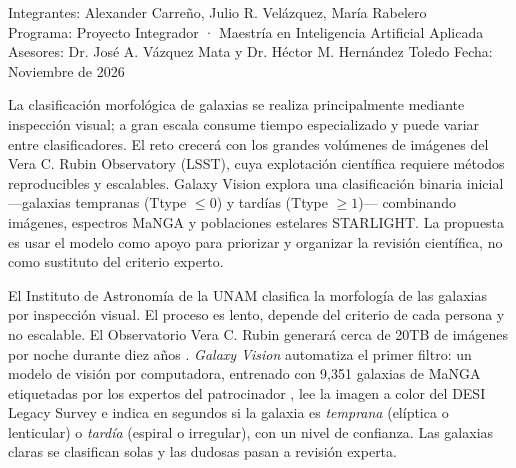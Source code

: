 \documentclass[letterpaper,11pt]{article}
\begin{document}
\thispagestyle{primera}

\smallskip
\noindent{\large\textcolor{black!60}{Resumen ejecutivo para el Instituto de Astronomía de la UNAM}\par}
\medskip

\noindent\begingroup\setlength{\fboxsep}{6pt}%
\colorbox{black!8}{\parbox{\dimexpr\linewidth-2\fboxsep\relax}{\small{}%
\textcolor{black!60}{Integrantes:} Alexander Carreño, Julio R. Velázquez, María Rabelero\\
\textcolor{black!60}{Programa:} Proyecto Integrador · Maestría en Inteligencia Artificial Aplicada\\
\textcolor{black!60}{Asesores:} Dr. José A. Vázquez Mata y Dr. Héctor M. Hernández Toledo \textcolor{black!60}{Fecha:} Noviembre de 2026}}%
\endgroup\par\medskip

La clasificación morfológica de galaxias se realiza principalmente mediante inspección visual; a gran escala consume tiempo especializado y puede variar entre clasificadores. El reto crecerá con los grandes volúmenes de imágenes del Vera C. Rubin Observatory (LSST), cuya explotación científica requiere métodos reproducibles y escalables. Galaxy Vision explora una clasificación binaria inicial —galaxias tempranas (Ttype $\leq 0$) y tardías (Ttype $\geq 1$)— combinando imágenes, espectros MaNGA y poblaciones estelares STARLIGHT. La propuesta es usar el modelo como apoyo para priorizar y organizar la revisión científica, no como sustituto del criterio experto.\

El Instituto de Astronomía de la UNAM clasifica la morfología de las galaxias por inspección visual. El proceso es lento, depende del criterio de cada persona y no escalable. El Observatorio Vera C. Rubin generará cerca de 20TB de imágenes por noche durante diez años \parencite{ivezic2019}. \emph{Galaxy Vision} automatiza el primer filtro: un modelo de visión por computadora, entrenado con 9,351 galaxias de MaNGA etiquetadas por los expertos del patrocinador \parencite{bundy2015, vazquezmata2022}, lee la imagen a color del DESI Legacy Survey \parencite{dey2019} e indica en segundos si la galaxia es \emph{temprana} (elíptica o lenticular) o \emph{tardía} (espiral o irregular), con un nivel de confianza. Las galaxias claras se clasifican solas y las dudosas pasan a revisión experta.
\end{document}
